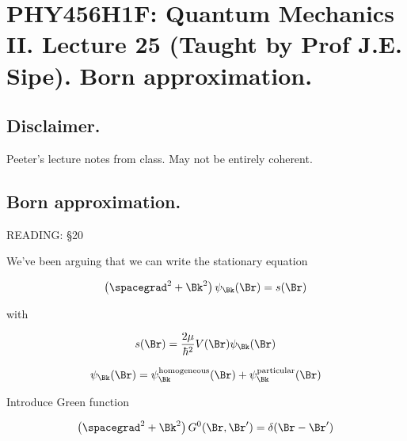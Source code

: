 
%


\chapter{PHY456H1F: Quantum Mechanics II.  Lecture 25 (Taught by Prof J.E. Sipe).  Born approximation.}
\label{chap:qmTwoL25}
\date{Dec 7, 2011}

\beginArtWithToc

\section{Disclaimer.}

Peeter's lecture notes from class.  May not be entirely coherent.

\section{Born approximation.}

READING: \S 20 \cite{desai2009quantum}

We've been arguing that we can write the stationary equation 

\begin{equation}\label{eqn:qmTwoL25:10}
\left( \spacegrad^2 + \Bk^2\right) \psi_\Bk(\Br) = s(\Br)
\end{equation}

with 

\begin{equation}\label{eqn:qmTwoL25:30}
s(\Br) = \frac{2\mu}{\hbar^2} V(\Br) \psi_\Bk(\Br)
\end{equation}

\begin{equation}\label{eqn:qmTwoL25:50}
\psi_\Bk(\Br) = \psi_\Bk^{\text{homogeneous}}(\Br) + \psi_\Bk^{\text{particular}}(\Br)
\end{equation}

Introduce Green function

\begin{equation}\label{eqn:qmTwoL25:70}
\left( \spacegrad^2 + \Bk^2\right) G^0(\Br, \Br') = \delta(\Br- \Br')
\end{equation}

